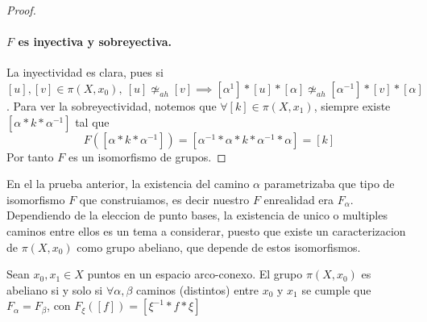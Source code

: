 \begin{proof}
  \paragraph{\(F\) es inyectiva y sobreyectiva.} La inyectividad es
  clara, pues si \([u],[v] \in \pi (X, x_0),\ [u] \not \simeq_{ah} [v]
  \implies [\alpha^{1}] * [u] * [\alpha] \not \simeq_{ah} [\alpha^{-1}] * [v]
  * [\alpha]\). Para ver la sobreyectividad, notemos que \(\forall [k] \in
  \pi (X, x_1) \), siempre existe \( [\alpha * k * \alpha^{-1}]\) tal
  que
  \[ F ([\alpha * k * \alpha^{-1}]) = [\alpha^{-1} * \alpha * k *
    \alpha^{-1} * \alpha] = [k]\]
  Por tanto \(F\) es un isomorfismo de grupos.
\end{proof}
En el la prueba anterior, la existencia del camino \(\alpha\)
parametrizaba que tipo de isomorfismo \(F\) que construiamos, es decir
nuestro \(F\) enrealidad era \(F_{\alpha}\). Dependiendo de la eleccion
de punto bases, la existencia de unico o multiples caminos entre ellos
es un tema a considerar, puesto que existe un caracterizacion de \(\pi
(X, x_0) \) como grupo abeliano, que depende de estos isomorfismos.
\begin{teorema}
  Sean \(x_0, x_1 \in X\) puntos en un espacio arco-conexo. El grupo
  \(\pi (X, x_0) \) es abeliano si y solo si \(\forall \alpha, \beta\)
  caminos (distintos) entre \(x_0\) y \(x_1\) se cumple que \(F_\alpha =
  F_\beta\), con \(F_{\xi} ([f]) = [\xi^{-1} * f * \xi] \)
\end{teorema}
